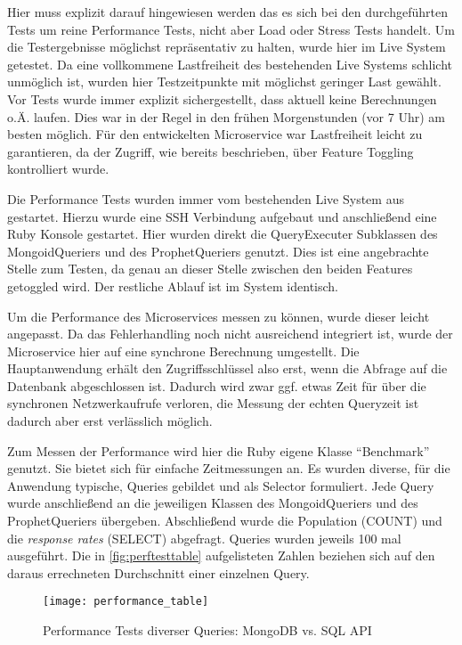 Hier muss explizit darauf hingewiesen werden das es sich bei den durchgeführten Tests um reine Performance Tests, nicht aber Load oder Stress Tests handelt.
Um die Testergebnisse möglichst repräsentativ zu halten, wurde hier im Live System getestet.\cite{msdn:perftesting} 
Da eine vollkommene Lastfreiheit des bestehenden Live Systems schlicht unmöglich ist, wurden hier Testzeitpunkte mit möglichst geringer Last gewählt. Vor Tests wurde immer explizit sichergestellt, dass aktuell keine Berechnungen o.Ä. laufen. Dies war in der Regel in den frühen Morgenstunden (vor 7 Uhr) am besten möglich.
Für den entwickelten Microservice war Lastfreiheit leicht zu garantieren, da der Zugriff, wie bereits beschrieben, über Feature Toggling kontrolliert wurde. 

Die Performance Tests wurden immer vom bestehenden Live System aus gestartet. Hierzu wurde eine SSH Verbindung aufgebaut und anschließend eine Ruby Konsole gestartet. Hier wurden direkt die QueryExecuter Subklassen des MongoidQueriers und des ProphetQueriers genutzt. Dies ist eine angebrachte Stelle zum Testen, da genau an dieser Stelle zwischen den beiden Features getoggled wird. Der restliche Ablauf ist im System identisch.

Um die Performance des Microservices messen zu können, wurde dieser leicht angepasst. Da das Fehlerhandling noch nicht ausreichend integriert ist, wurde der Microservice hier auf eine synchrone Berechnung umgestellt. Die Hauptanwendung erhält den Zugriffsschlüssel also erst, wenn die Abfrage auf die Datenbank abgeschlossen ist. Dadurch wird zwar ggf. etwas Zeit für über die synchronen Netzwerkaufrufe verloren, die Messung der echten Queryzeit ist dadurch aber erst verlässlich möglich.

Zum Messen der Performance wird hier die Ruby eigene Klasse ``Benchmark'' genutzt. Sie bietet sich für einfache Zeitmessungen an. 
Es wurden diverse, für die Anwendung typische, Queries gebildet und als Selector formuliert. Jede Query wurde anschließend an die jeweiligen Klassen des MongoidQueriers und des ProphetQueriers übergeben. Abschließend wurde die Population (COUNT) und die \textit{response rates} (SELECT) abgefragt. Queries wurden jeweils 100 mal ausgeführt. Die in \autoref{fig:perftesttable} aufgelisteten Zahlen beziehen sich auf den daraus errechneten Durchschnitt einer einzelnen Query.

\begin{figure}[!ht]
    \centering
    \caption{Performance Tests diverser Queries: MongoDB vs. SQL API}
    \label{fig:perftesttable}
    \texttt{[image: performance\_table]}
\end{figure}

